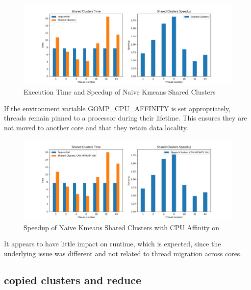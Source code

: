 \documentclass{article}
\newcommand{\eng}[1]{#1}
\begin{document}
\begin{figure}[h]
    \centering
    \includegraphics[width=\textwidth]{a2/plots/kmeans_naive_time_speedup.png}
    \caption{Execution Time and \eng{Speedup} of \eng{Naive Kmeans Shared Clusters}}
    \label{fig:kmeans-naive-shared-clusters}
\end{figure}
\FloatBarrier

If the environment variable \eng{GOMP\_CPU\_AFFINITY} is set appropriately, threads remain pinned to a processor during their lifetime. This ensures they are not moved to another core and that they retain data locality.

\begin{figure}[h]
    \centering
    \includegraphics[width=\textwidth]{a2/plots/kmeans_naive_time_speedup_aff_on.png}
    \caption{\eng{Speedup} of \eng{Naive Kmeans Shared Clusters} with CPU Affinity on}
    \label{kmeans_naive_time_speedup_aff_on}
\end{figure}
\FloatBarrier

It appears to have little impact on runtime, which is expected, since the underlying issue was different and not related to thread migration across cores.

\subsection{\eng{copied clusters and reduce}}
\end{document}
